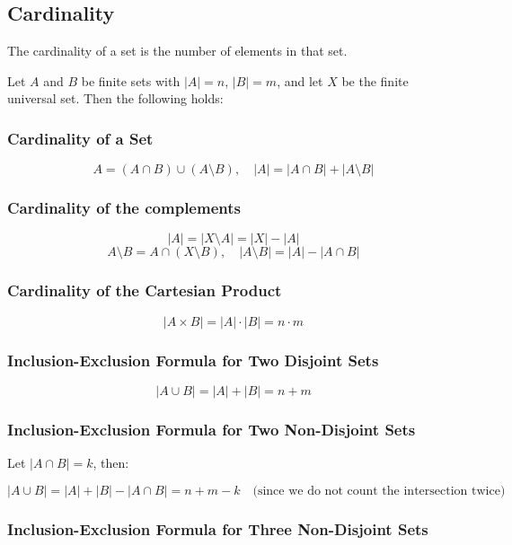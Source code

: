 \subsection{Cardinality}

The cardinality of a set is the number of elements in that set.

Let \(A\) and \(B\) be finite sets with \( |A| = n \), \( |B| = m \), and let \(X\) be the finite 
universal set. Then the following holds:

\subsubsection{Cardinality of a Set}

\[
	A = (A \cap B) \cup (A \setminus B), \quad |A| = |A \cap B| + |A \setminus B|
\]

\subsubsection{Cardinality of the complements}

\[
	|A| = |X \setminus A| = |X| - |A|
\]
\[
	A \setminus B = A \cap (X \setminus B), \quad |A \setminus B| = |A| - |A \cap B|
\]

\subsubsection{Cardinality of the Cartesian Product}

\[
	|A \times B| = |A| \cdot |B| = n \cdot m
\]

\subsubsection{Inclusion-Exclusion Formula for Two Disjoint Sets}

\[
	|A \cup B| = |A| + |B| = n + m
\]

\subsubsection{Inclusion-Exclusion Formula for Two Non-Disjoint Sets}

Let \( |A \cap B| = k \), then:

\[
	|A \cup B| = |A| + |B| - |A \cap B| = n + m - k \quad \text{(since we do not count the intersection 
	twice)}
\]

\subsubsection{Inclusion-Exclusion Formula for Three Non-Disjoint Sets}

